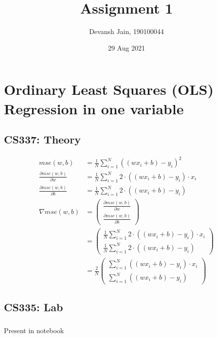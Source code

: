 \documentclass[12pt, fleqn]{article}
\title{Assignment 1}
\author{Devansh Jain, 190100044}
\date{29 Aug 2021}
\newcommand{\twoxone}[2]{
    \begin{pmatrix}
        #1 \\
        #2
    \end{pmatrix}
}
\begin{document}
\maketitle
\tableofcontents
\thispagestyle{empty}
\setcounter{page}{0}

\newpage
\section{Ordinary Least Squares (OLS) Regression in one variable}

\subsection{CS337: Theory}
\begin{equation*}
  \begin{aligned}
    mse(w,b)                             & = \frac{1}{N} \sum_{i=1}^N ((w x_i + b) - y_i)^2                                                                                 \\
    \frac{\partial mse(w,b)}{\partial w} & = \frac{1}{N} \sum_{i=1}^N 2 \cdot ((w x_i + b) - y_i) \cdot x_i                                                                 \\
    \frac{\partial mse(w,b)}{\partial b} & = \frac{1}{N} \sum_{i=1}^N 2 \cdot ((w x_i + b) - y_i)                                                                           \\
    \nabla mse(w,b)                      & = \twoxone{\frac{\partial mse (w,b)}{\partial w}}{\frac{\partial mse (w,b)}{\partial b}}                                         \\
                                         & = \twoxone{\frac{1}{N} \sum_{i=1}^N 2 \cdot ((w x_i + b) - y_i) \cdot x_i}{\frac{1}{N} \sum_{i=1}^N 2 \cdot ((w x_i + b) - y_i)} \\
                                         & = \frac{2}{N} \twoxone{\sum_{i=1}^N ((w x_i + b) - y_i) \cdot x_i}{\sum_{i=1}^N ((w x_i + b) - y_i)}
  \end{aligned}
\end{equation*}

\subsection{CS335: Lab}
\subsubsection{}
Present in notebook
\end{document}
